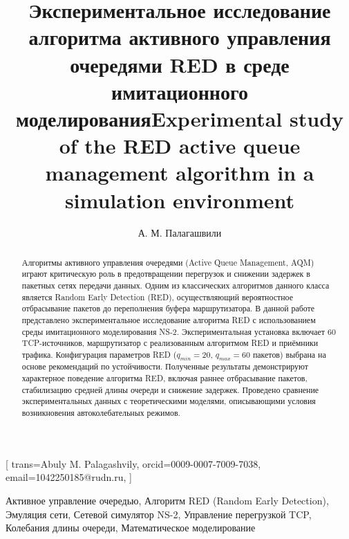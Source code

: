 \documentclass[%
]{ittmm}
\begin{document}



\title{Экспериментальное исследование алгоритма активного управления очередями RED в среде имитационного моделирования}
\title[mode=trans]{Experimental study of the RED active queue management algorithm in a simulation environment}

\author{А. М. Палагашвили}[%
  trans={Abuly M. Palagashvily},
  orcid=0009-0007-7009-7038,
  email=1042250185@rudn.ru,
]


\address{%
  Российский университет дружбы народов,
  ул. Миклухо-Маклая, д.~6,
Москва, 117198, Российская Федерация}



\begin{keywords}
  Активное управление очередью, Алгоритм RED (Random Early Detection), Эмуляция сети, Сетевой симулятор NS-2, Управление перегрузкой TCP, Колебания длины очереди, Математическое моделирование
\end{keywords}

\begin{abstract}
  Алгоритмы активного управления очередями (Active Queue Management, AQM) играют критическую роль в предотвращении перегрузок и снижении задержек в пакетных сетях передачи данных. Одним из классических алгоритмов данного класса является Random Early Detection (RED), осуществляющий вероятностное отбрасывание пакетов до переполнения буфера маршрутизатора. В данной работе представлено экспериментальное исследование алгоритма RED с использованием среды имитационного моделирования NS-2. Экспериментальная установка включает 60 TCP-источников, маршрутизатор с реализованным алгоритмом RED и приёмники трафика. Конфигурация параметров RED ($q_{min}=20$, $q_{max}=60$ пакетов) выбрана на основе рекомендаций по устойчивости. Полученные результаты демонстрируют характерное поведение алгоритма RED, включая раннее отбрасывание пакетов, стабилизацию средней длины очереди и снижение задержек. Проведено сравнение экспериментальных данных с теоретическими моделями, описывающими условия возникновения автоколебательных режимов.
\end{abstract}
\end{document}
